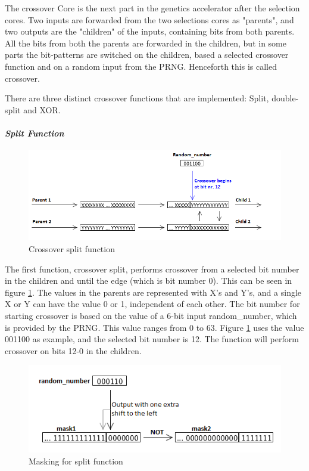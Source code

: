 The crossover Core is the next part in the genetics accelerator after the selection cores.
Two inputs are forwarded from the two selections cores as "parents", and two outputs are the "children" of the inputs, containing bits from both parents.
All the bits from both the parents are forwarded in the children, but in some parts the bit-patterns are switched on the children, based a selected crossover function and on a random input from the PRNG.
Henceforth this is called crossover.

There are three distinct crossover functions that are implemented: Split, double-split and XOR.


\paragraph{\textit{Split Function}}
\begin{figure}[H]
\includegraphics[width=\textwidth]{fpga/fig/crossover_split.png}
\caption{Crossover split function}
\label{fig_crossover_split}
\end{figure}

The first function, crossover split, performs crossover from a selected bit number in the children and until the edge (which is bit number 0).
This can be seen in figure \ref{fig_crossover_split}.
The values in the parents are represented with X's and Y's, and a single X or Y can have the value 0 or 1, independent of each other.
The bit number for starting crossover is based on the value of a 6-bit input random\_number, which is provided by the PRNG. 
This value ranges from 0 to 63. 
Figure \ref{fig_crossover_split} uses the value 001100 as example, and the selected bit number is 12. 
The function will perform crossover on bits 12-0 in the children.

\begin{figure}[H]
\includegraphics[width=\textwidth]{fpga/fig/crossover_split_mask.png}
\caption{Masking for split function}
\label{fig_crossover_split_mask}
\end{figure}


